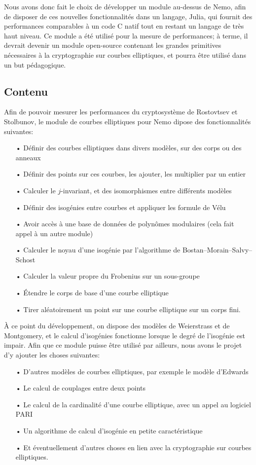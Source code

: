 \documentclass[11pt,a4paper]{article}
\renewcommand{\v}{\vspace{5mm}}
\theoremstyle{definition}
\begin{document}
Nous avons donc fait le choix de développer un module au-dessus de Nemo, afin de disposer de ces nouvelles fonctionnalités dans un langage, Julia, qui fournit des performances comparables à un code C natif tout en restant un langage de très haut niveau. Ce module a été utilisé pour la mesure de performances; à terme, il devrait devenir un module open-source contenant les grandes primitives nécessaires à la cryptographie sur courbes elliptiques, et pourra être utilisé dans un but pédagogique.


\subsection{Contenu}

Afin de pouvoir mesurer les performances du cryptosystème de Rostovtsev et Stolbunov, le module de courbes elliptiques pour Nemo dipose des fonctionnalités suivantes:
\begin{itemize}
\item[•] Définir des courbes elliptiques dans divers modèles, sur des corps ou des anneaux
\item[•] Définir des points sur ces courbes, les ajouter, les multiplier par un entier
\item[•] Calculer le $j$-invariant, et des isomorphismes entre différents modèles
\item[•] Définir des isogénies entre courbes et appliquer les formule de Vélu
\item[•] Avoir accès à une base de données de polynômes modulaires (cela fait appel à un autre module)
\item[•] Calculer le noyau d'une isogénie par l'algorithme de Bostan--Morain--Salvy--Schost
\item[•] Calculer la valeur propre du Frobenius sur un sous-groupe
\item[•] Étendre le corps de base d'une courbe elliptique
\item[•] Tirer aléatoirement un point sur une courbe elliptique sur un corps fini.
\end{itemize}

\v
À ce point du développement, on dispose des modèles de Weierstrass et de Montgomery, et le calcul d'isogénies fonctionne lorsque le degré de l'isogénie est impair. Afin que ce module puisse être utilisé par ailleurs, nous avons le projet d'y ajouter les choses suivantes:

\begin{itemize}
\item[•] D'autres modèles de courbes elliptiques, par exemple le modèle d'Edwards
\item[•] Le calcul de couplages entre deux points
\item[•] Le calcul de la cardinalité d'une courbe elliptique, avec un appel au logiciel PARI
\item[•] Un algorithme de calcul d'isogénie en petite caractéristique
\item[•] Et éventuellement d'autres choses en lien avec la cryptographie sur courbes elliptiques.
\end{itemize}
\end{document}

